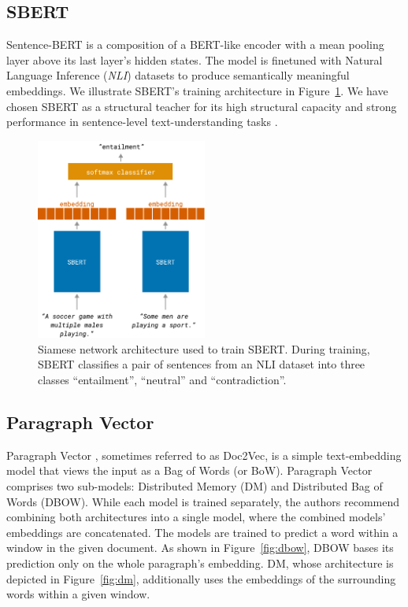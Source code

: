 \subsection{SBERT}

Sentence-BERT is a composition of a BERT-like \citep{devlin2019bert} encoder
with a mean pooling layer above its last layer's hidden states. The model is
finetuned with Natural Language Inference (\emph{NLI}) datasets to produce
semantically meaningful embeddings. We illustrate SBERT's training
architecture in Figure~\ref{fig:sbert}. We have chosen SBERT as a structural
teacher for its high structural capacity and strong performance in
sentence-level text-understanding tasks \citep{reimers2019sentence}.

\begin{figure}
  \centering
  \includegraphics[width=0.5\textwidth]{./img/sbert_architecture.pdf}

  \caption{Siamese network architecture used to train SBERT. During training,
  SBERT classifies a pair of sentences from an NLI dataset into three classes
  ``entailment'', ``neutral'' and ``contradiction''.}

  \label{fig:sbert}

\end{figure}

\subsection{Paragraph Vector}\label{section:paragraph_vector}

Paragraph Vector \citep{le2014distributed}, sometimes referred to as Doc2Vec,
is a simple text-embedding model that views the input as a Bag of Words (or
BoW). Paragraph Vector comprises two sub-models: Distributed Memory (DM) and
Distributed Bag of Words (DBOW). While each model is trained separately, the
authors recommend combining both architectures into a single model, where the
combined models' embeddings are concatenated. The models are trained to predict
a word within a window in the given document. As shown in
Figure~\ref{fig:dbow}, DBOW bases its prediction only on the whole paragraph's
embedding. DM, whose architecture is depicted in Figure~\ref{fig:dm},
additionally uses the embeddings of the surrounding words within a given
window.

